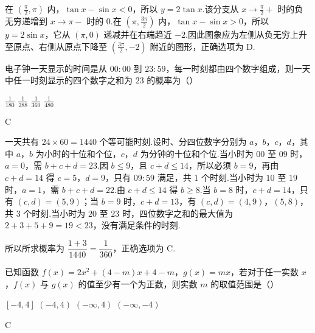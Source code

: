 \begin{solution}
在 \(\left(\frac\pi2,\pi\right)\) 内，\(\tan x-\sin x<0\)，所以 \(y=2\tan x\).该分支从 \(x\to\frac\pi2+\) 时的负无穷递增到 \(x\to\pi-\) 时的 \(0\).在 \(\left(\pi,\frac{3\pi}2\right)\) 内，\(\tan x-\sin x>0\)，所以 \(y=2\sin x\)，它从 \((\pi,0)\) 递减并在右端趋近 \(-2\).因此图象应为左侧从负无穷上升至原点、右侧从原点下降至 \(\left(\frac{3\pi}2,-2\right)\) 附近的图形，正确选项为 D.
\end{solution}

\begin{problem}
电子钟一天显示的时间是从 \(00{:}00\) 到 \(23{:}59\)，每一时刻都由四个数字组成，则一天中任一时刻显示的四个数字之和为 \(23\) 的概率为（\quad）

\choices
    {\(\frac{1}{180}\)}
    {\(\frac{1}{288}\)}
    {\(\frac{1}{360}\)}
    {\(\frac{1}{480}\)}
\end{problem}

\begin{answer}
C
\end{answer}

\begin{solution}
一天共有 \(24\times60=1440\) 个等可能时刻.设时、分四位数字分别为 \(a\)，\(b\)，\(c\)，\(d\)，其中 \(a\)，\(b\) 为小时的十位和个位，\(c\)，\(d\) 为分钟的十位和个位.当小时为 \(00\) 至 \(09\) 时，\(a=0\)，需 \(b+c+d=23\).因 \(b\leqslant9\)，且 \(c+d\leqslant14\)，所以必须 \(b=9\)，再由 \(c+d=14\) 得 \(c=5\)，\(d=9\)，只有 \(09{:}59\) 满足，共 \(1\) 个时刻.当小时为 \(10\) 至 \(19\) 时，\(a=1\)，需 \(b+c+d=22\).由 \(c+d\leqslant14\) 得 \(b\geqslant8\).当 \(b=8\) 时，\(c+d=14\)，只有 \((c,d)=(5,9)\)；当 \(b=9\) 时，\(c+d=13\)，有 \((c,d)=(4,9)\)，\((5,8)\)，共 \(3\) 个时刻.当小时为 \(20\) 至 \(23\) 时，四位数字之和的最大值为 \(2+3+5+9=19<23\)，没有满足条件的时刻.

所以所求概率为 \(\dfrac{1+3}{1440}=\dfrac1{360}\)，正确选项为 C.
\end{solution}

\begin{problem}
已知函数 \( f(x) = 2x^{2} + (4 - m)x + 4 - m \)，\( g(x) = mx \)，若对于任一实数 \( x \)，\( f(x) \) 与 \( g(x) \) 的值至少有一个为正数，则实数 \( m \) 的取值范围是（\quad）

\choices
    {\([-4, 4]\)}
    {\((-4, 4)\)}
    {\((- \infty, 4)\)}
    {\((- \infty, -4)\)}
\end{problem}

\begin{answer}
C
\end{answer}

